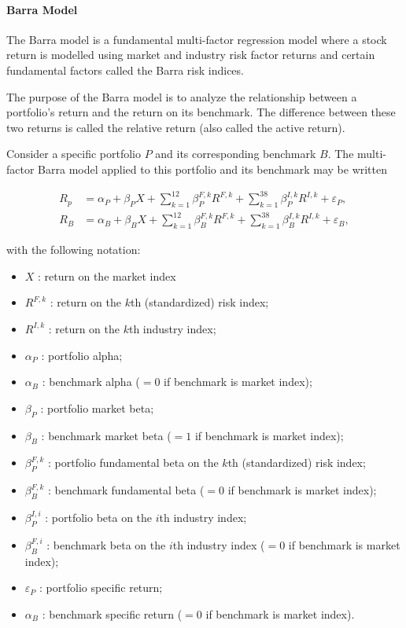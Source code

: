 \paragraph{Barra Model} The Barra model is a fundamental multi-factor regression model where a stock return is modelled using market and industry risk factor returns and certain fundamental factors called the Barra risk indices. 

The purpose of the Barra model is to analyze the relationship between a portfolio's return and the return on its benchmark. The difference between these two returns is called the relative return (also called the active return). 

Consider a specific portfolio $P$ and its corresponding benchmark $B$. The multi-factor Barra
model applied to this portfolio and its benchmark may be written

\begin{align*}
R_p &= \alpha_P + \beta_P X + \sum_{k=1}^{12} \beta_P^{F,k} R^{F,k} + \sum_{k=1}^{38} \beta_P^{I,k} R^{I,k} + \varepsilon_P,
\\
R_B &= \alpha_B + \beta_B X + \sum_{k=1}^{12} \beta_B^{F,k} R^{F,k} + \sum_{k=1}^{38} \beta_B^{I,k} R^{I,k} + \varepsilon_B,
\end{align*}

with the following notation:

\begin{itemize}[leftmargin=*,noitemsep]
  \item $X$ : return on the market index
  \item $R^{F,k}$ : return on the $k$th (standardized) risk index;
  \item $R^{I,k}$ : return on the $k$th industry index;
  \item $\alpha_P$ : portfolio alpha;
  \item $\alpha_B$ : benchmark alpha ($= 0$ if benchmark is market index);
  \item $\beta_P$ : portfolio market beta;
  \item $\beta_B$ : benchmark market beta ($= 1$ if benchmark is market index);
  \item $\beta_P^{F,k}$ : portfolio fundamental beta on the $k$th (standardized) risk index;
  \item $\beta_B^{F,k}$ : benchmark fundamental beta ($= 0$ if benchmark is market index);
  \item $\beta_P^{I,i}$ : portfolio beta on the $i$th industry index;
  \item $\beta_B^{F,i}$ : benchmark beta on the $i$th industry index ($= 0$ if benchmark is market index);
  \item $\varepsilon_P$ : portfolio specific return;
  \item $\alpha_B$ : benchmark specific return ($= 0$ if benchmark is market index).
\end{itemize}

